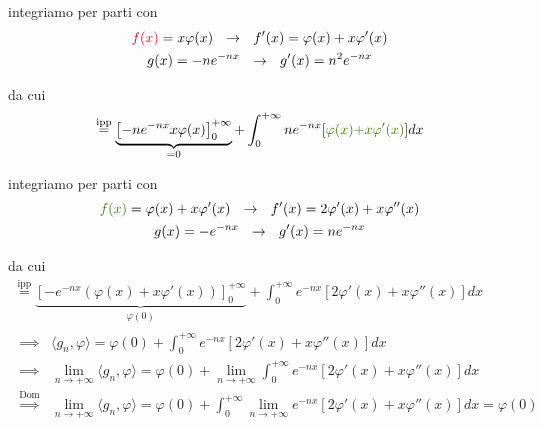 \begin{enumerate}
integriamo per parti con
\begin{gather*}
\textcolor[rgb]{0.82, 0.01, 0.11}{f}\textcolor[rgb]{0.82, 0.01, 0.11}{(}\textcolor[rgb]{0.82, 0.01, 0.11}{x}\textcolor[rgb]{0.82, 0.01, 0.11}{)} = x\varphi (x) \ \ \rightarrow \ \ f'(x) = \varphi (x) + x\varphi'(x)\\
g(x) = - ne^{- nx} \ \ \rightarrow \ \ g'(x) = n^{2} e^{- nx}
\end{gather*}

da cui
\begin{equation*}
\overset{\text{ipp}}{=}\underbrace{\left[ - ne^{- nx} x\varphi (x)\right]^{+ \infty}_{0}}_{= 0} + \int^{+ \infty}_{0} ne^{- nx}[\textcolor[rgb]{0.25, 0.46, 0.02}{\varphi}\textcolor[rgb]{0.25, 0.46, 0.02}{(}\textcolor[rgb]{0.25, 0.46, 0.02}{x}\textcolor[rgb]{0.25, 0.46, 0.02}{)}\textcolor[rgb]{0.25, 0.46, 0.02}{+ x\varphi'}\textcolor[rgb]{0.25, 0.46, 0.02}{(}\textcolor[rgb]{0.25, 0.46, 0.02}{x}\textcolor[rgb]{0.25, 0.46, 0.02}{)}] dx
\end{equation*}

integriamo per parti con
\begin{gather*}
\textcolor[rgb]{0.25, 0.46, 0.02}{f}\textcolor[rgb]{0.25, 0.46, 0.02}{(}\textcolor[rgb]{0.25, 0.46, 0.02}{x}\textcolor[rgb]{0.25, 0.46, 0.02}{)} = \varphi (x) + x\varphi'(x) \ \ \rightarrow \ \ f'(x) = 2\varphi'(x) + x\varphi''(x)\\
g(x) = - e^{- nx} \ \ \rightarrow \ \ g'(x) = ne^{- nx}
\end{gather*}

da cui
\begin{gather*}
\overset{\text{ipp}}{=}\underbrace{\left[ - e^{- nx}(\varphi (x) + x\varphi'(x))\right]^{+ \infty}_{0}}_{\varphi (0)} + \int^{+ \infty}_{0} e^{- nx}[ 2\varphi'(x) + x\varphi''(x)] dx\\
\begin{aligned}
\implies & \langle g_{n}, \varphi \rangle = \varphi (0) + \int^{+ \infty}_{0} e^{- nx}[ 2\varphi'(x) + x\varphi''(x)] dx\\
\implies & \lim\limits_{n\rightarrow + \infty} \langle g_{n}, \varphi \rangle = \varphi (0) + \lim\limits_{n\rightarrow + \infty}\int^{+ \infty}_{0} e^{- nx}[ 2\varphi'(x) + x\varphi''(x)] dx\\
\overset{\text{Dom}}{\implies} & \lim\limits_{n\rightarrow + \infty} \langle g_{n}, \varphi \rangle = \varphi (0) + \int^{+ \infty}_{0}\lim\limits_{n\rightarrow + \infty} e^{- nx}[ 2\varphi'(x) + x\varphi''(x)] dx = \varphi (0)
\end{aligned}
\end{gather*}


\end{enumerate}
